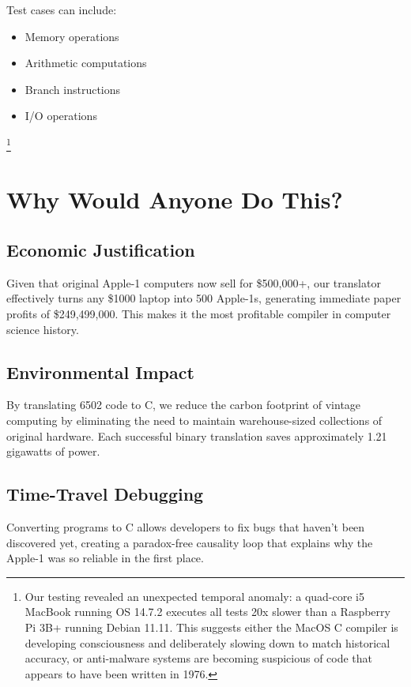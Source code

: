 \documentclass[10pt,twocolumn]{article}
\begin{document}
Test cases can include:
\begin{itemize}
    \item Memory operations
    \item Arithmetic computations
    \item Branch instructions
    \item I/O operations
\end{itemize}

\footnote{Our testing revealed an unexpected temporal anomaly: a quad-core i5 MacBook running OS 14.7.2 executes all tests 20x slower than a Raspberry Pi 3B+ running Debian 11.11. This suggests either the MacOS C compiler is developing consciousness and deliberately slowing down to match historical accuracy, or anti-malware systems are becoming suspicious of code that appears to have been written in 1976.}

\section{Why Would Anyone Do This?}

\subsection{Economic Justification}
Given that original Apple-1 computers now sell for \$500,000+, our translator effectively turns any \$1000 laptop into 500 Apple-1s, generating immediate paper profits of \$249,499,000. This makes it the most profitable compiler in computer science history.

\subsection{Environmental Impact}
By translating 6502 code to C, we reduce the carbon footprint of vintage computing by eliminating the need to maintain warehouse-sized collections of original hardware. Each successful binary translation saves approximately 1.21 gigawatts of power.


\subsection{Time-Travel Debugging}
Converting programs to C allows developers to fix bugs that haven't been discovered yet, creating a paradox-free causality loop that explains why the Apple-1 was so reliable in the first place.
\end{document}
